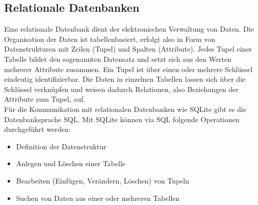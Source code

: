 \subsection{Relationale Datenbanken}
Eine relationale Datenbank dient der elektronischen Verwaltung von Daten. Die Organisation der Daten ist tabellenbasiert, erfolgt also in Form von Datenstrukturen mit Zeilen (Tupel) und Spalten (Attribute). Jedes Tupel einer Tabelle bildet den sogenannten Datensatz und setzt sich aus den Werten mehrerer Attribute zusammen. Ein Tupel ist über einen oder mehrere Schlüssel eindeutig identifizierbar. Die Daten in einzelnen Tabellen lassen sich über die Schlüssel verknüpfen und weisen dadurch Relationen, also Beziehungen der Attribute zum Tupel, auf. \\
Für die Kommunikation mit relationalen Datenbanken wie SQLite gibt es die Datenbanksprache \gls{SQL}. Mit SQLite können via \gls{SQL} folgende Operationen durchgeführt werden:
\begin{itemize}[leftmargin=0.7cm]
\renewcommand\labelitemi{--}
	\item Definition der Datenstruktur
	\item Anlegen und Löschen einer Tabelle
	\item Bearbeiten (Einfügen, Verändern, Löschen) von Tupeln
	\item Suchen von Daten aus einer oder mehreren Tabellen
\end{itemize}
